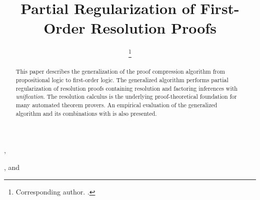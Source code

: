 \documentclass{iosart2x}
\theoremstyle{definition}
\begin{document}
\begin{frontmatter} 
\title{Partial Regularization of First-Order Resolution Proofs}


\author[A]{ %
\thanks{Corresponding author. .}%
}, 
\author[B]{ }, and 
\author[C]{ }

\address[A]{School of Computer Science, , 200 University Ave. W., Waterloo, ON N2L 3G1, }
\address[B]{, Av. Pellegrini 250, S2000BTP Rosario, Santa Fe, }
\address[C]{College of Engineering and Computer Science, ,
Canberra ACT 0200, \\
,
Karlsplatz 13, 1040, Vienna, 
}

\begin{abstract}
This paper describes the generalization of the 
proof compression algorithm
\RecyclePivotsIntersection 
from propositional logic to first-order logic. The generalized algorithm performs partial regularization of resolution proofs containing resolution and factoring inferences with \emph{unification}. The resolution calculus is the underlying proof-theoretical foundation for many automated theorem provers. An empirical evaluation of the generalized algorithm and its combinations with \SFOLowerUnits is also presented.
\end{abstract}

\begin{keyword}
\end{keyword}



\end{frontmatter}
\end{document}
